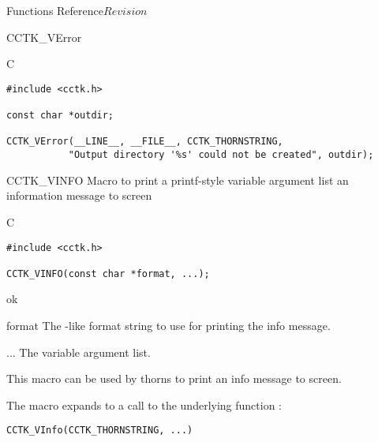 \begin{cactuspart}{ Functions Reference}{}{$Revision$}
\begin{FunctionDescription}{CCTK\_VError}
\begin{ExampleSection}
\begin{Example}{C}
\begin{verbatim}
#include <cctk.h>

const char *outdir;

CCTK_VError(__LINE__, __FILE__, CCTK_THORNSTRING,
           "Output directory '%s' could not be created", outdir);
\end{verbatim}
\end{Example}
\end{ExampleSection}
\end{FunctionDescription}


\begin{FunctionDescription}{CCTK\_VINFO}
\label{CCTK-VINFO}
Macro to print a printf-style variable argument list an information
message to screen

\begin{SynopsisSection}
\begin{Synopsis}{C}
\begin{verbatim}
#include <cctk.h>

CCTK_VINFO(const char *format, ...);
\end{verbatim}
\end{Synopsis}
\end{SynopsisSection}

\begin{ResultSection}
\begin{Result}{0} ok \end{Result}
\end{ResultSection}

\begin{ParameterSection}
\begin{Parameter}{format}
The -like format string to use for printing the info message.
\end{Parameter}
\begin{Parameter}{...}
The variable argument list.
\end{Parameter}
\end{ParameterSection}

\begin{Discussion}
This macro can be used by thorns to print an info message to screen.

The macro  expands to a call to the
underlying function :

\begin{verbatim}
CCTK_VInfo(CCTK_THORNSTRING, ...)
\end{verbatim}


\end{Discussion}
\end{FunctionDescription}
\end{cactuspart}
